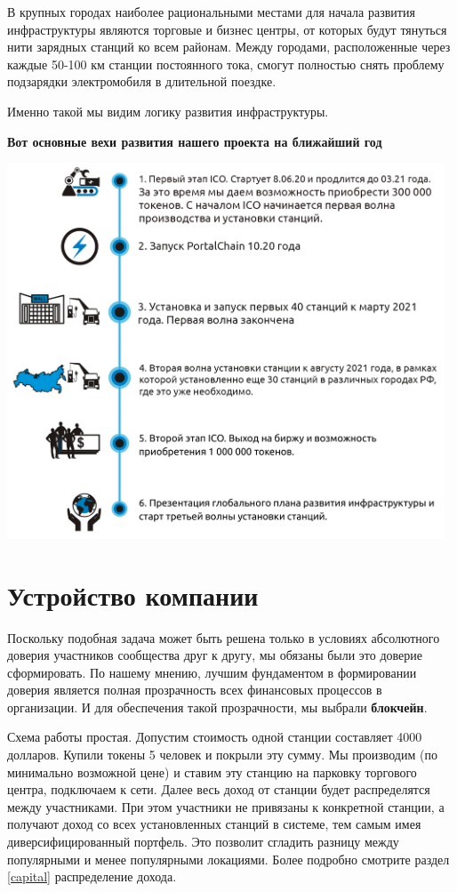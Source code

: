 \documentclass[a4paper,12pt]{report}
\begin{document}
В крупных городах наиболее рациональными местами для начала развития инфраструктуры являются торговые и бизнес центры, от которых будут тянуться нити зарядных станций ко всем районам. Между городами, расположенные через каждые 50-100 км станции постоянного тока, смогут полностью снять проблему подзарядки электромобиля в длительной поездке. 

Именно такой мы видим логику развития инфраструктуры.


\begin{center}
	\textbf{Вот основные вехи развития нашего проекта на ближайший год}
\end{center}

\includegraphics[width=13cm]{roadmap}
\vspace*{1cm}

\chapter{Устройство компании}
Поскольку подобная задача может быть решена только в условиях абсолютного доверия участников сообщества друг к другу, мы обязаны были это доверие сформировать. По нашему мнению, лучшим фундаментом в формировании доверия является полная прозрачность всех финансовых процессов в организации. И для обеспечения такой прозрачности, мы выбрали \textbf{блокчейн}. 

Схема работы простая. Допустим стоимость одной станции составляет 4000 долларов. Купили токены 5 человек и покрыли эту сумму. Мы производим (по минимально возможной цене) и ставим эту станцию на парковку торгового центра, подключаем к сети. 
Далее весь доход от станции будет распределятся между участниками. При этом участники не привязаны к конкретной станции, а получают доход со всех установленных станций в системе, тем самым имея диверсифицированный портфель. Это позволит сгладить разницу между популярными и менее популярными локациями. 
Более подробно смотрите раздел \ref{capital} распределение дохода.
\end{document}
